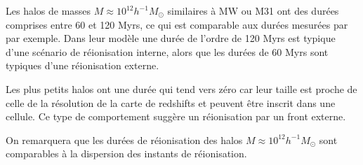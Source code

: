 Les halos de masses $M \approx 10^{12} h^{-1}M_\odot$ similaires à MW ou M31 ont des durées comprises entre 60 et 120 Myrs, ce qui est comparable aux durées mesurées par \cite{ocvirk_reionization_2014} par exemple.
Dans leur modèle une durée de l'ordre de 120 Myrs est typique d'une scénario de réionisation interne, alors que les durées de 60 Myrs sont typiques d'une réionisation externe.

Les plus petits halos ont une durée qui tend vers zéro car leur taille est proche de celle de la résolution de la carte de redshifts et peuvent être inscrit dans une cellule.
Ce type de comportement suggère un réionisation par un front externe.

On remarquera que les durées de réionisation des halos $M \approx 10^{12} h^{-1}M_\odot$ sont comparables à la dispersion des instants de réionisation.




%
%


